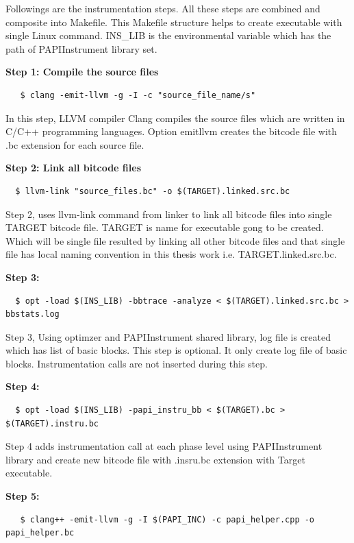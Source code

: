 Followings are the instrumentation steps. All these steps are combined and composite into Makefile. This Makefile structure helps to create executable with single Linux command. INS\_LIB is the environmental variable which has the path of PAPIInstrument library set. 

  \textbf{Step 1: Compile the source files}
  \begin{lstlisting}
   $ clang -emit-llvm -g -I -c "source_file_name/s"
  \end{lstlisting}

In this step, LLVM compiler Clang compiles the source files which are written in C/C++ programming languages. Option \-emit\-llvm creates the bitcode file with .bc extension for each source file. 

  \textbf{Step 2: Link all bitcode files}
  \begin{lstlisting}
  $ llvm-link "source_files.bc" -o $(TARGET).linked.src.bc
  \end{lstlisting}

Step 2, uses llvm-link command from linker to link all bitcode files into single TARGET bitcode file. TARGET is name for executable gong to be created. Which will be single file resulted by linking all other bitcode files and that single file has local naming convention in this thesis work i.e. TARGET.linked.src.bc.

  \textbf{Step 3: }
  \begin{lstlisting}
  $ opt -load $(INS_LIB) -bbtrace -analyze < $(TARGET).linked.src.bc > bbstats.log
  \end{lstlisting}
  
  Step 3, Using optimzer and PAPIInstrument shared library, log file is created which has list of basic blocks. This step is optional. It only create log file of basic blocks. Instrumentation calls are not inserted during this step.
  
    \textbf{Step 4: }
  \begin{lstlisting}
  $ opt -load $(INS_LIB) -papi_instru_bb < $(TARGET).bc > $(TARGET).instru.bc
  \end{lstlisting}
  
  Step 4 adds instrumentation call at each phase level using PAPIInstrument library and create new bitcode file with .insru.bc extension with Target executable.

    \textbf{Step 5: }
  \begin{lstlisting}
   $ clang++ -emit-llvm -g -I $(PAPI_INC) -c papi_helper.cpp -o papi_helper.bc
  \end{lstlisting}
  
